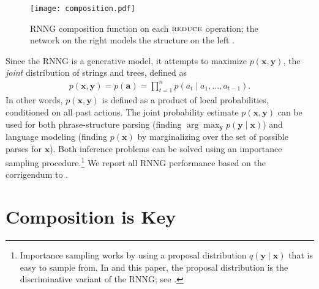 \documentclass[11pt]{article}
\newcommand{\ignore}[1]{}
\newcommand{\nascomment}[1]{\textcolor{blue}{{\textbf{[#1 --\textsc{nas}]}}}}
\newcommand{\miguelcomment}[1]{\textcolor{red}{{\textbf{[#1 --\textsc{miguel}]}}}}
\renewcommand{\nascomment}[1]{}
\renewcommand{\miguelcomment}[1]{}
\begin{document}
\begin{figure}[h]
\centering
\texttt{[image: composition.pdf]}
\vspace{-1.3cm}
\caption{RNNG composition function on each $\textsc{reduce}$ operation; the network on the right models the structure on the left \cite{rnng}.}
\label{fig:composition}
\end{figure}


Since the RNNG is a generative model, it attempts to maximize $p(\boldsymbol{x}, \boldsymbol{y})$, the \emph{joint} distribution of strings and trees, defined as
\begin{align*}
p(\boldsymbol{x}, \boldsymbol{y}) = p(\boldsymbol{a}) = \prod_{t=1}^{n} p(a_t \mid a_1,\ldots,a_{t-1}).
\end{align*}
In other words, $p(\boldsymbol{x}, \boldsymbol{y})$ is defined as a product of local probabilities, conditioned on all past actions. The joint probability estimate $p(\boldsymbol{x}, \boldsymbol{y})$ can be used for both phrase-structure parsing (finding $\arg\max_{\boldsymbol{y}} p(\boldsymbol{y} \mid \boldsymbol{x})$)  and language modeling (finding $p(\boldsymbol{x})$ by marginalizing over the set of possible parses for $\boldsymbol{x}$).  Both inference problems can be solved using an importance sampling procedure.\footnote{Importance sampling works by using a proposal distribution $q(\boldsymbol{y} \mid \boldsymbol{x})$ that is easy to sample from. In  and this paper, the proposal distribution is the discriminative variant of the RNNG; see .} We report all RNNG performance based on the corrigendum to .

\ignore{\miguelcomment{I think sect. 2 is too long, we have already published a paper with that info. If you want to do it like this, you should add some discussion about the things that you want to study/change in this paper... research questions,etc.}
\nascomment{disagree.  section 1 is way too long -- coming back to that later.  section 2 needs to make the paper self-contained since our contributions rely on digging into the model details}\miguelcomment{True. I "ignored" both comments}}

\section{Composition is Key}\label{sec:composition_analysis}
\end{document}
